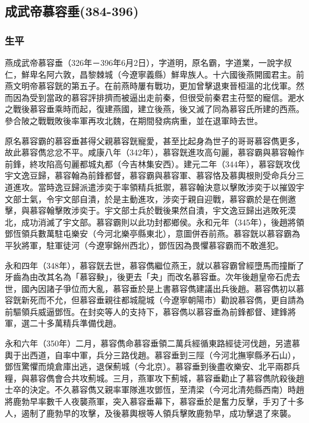 
\subsection{成武帝慕容垂\tiny(384-396)}

\subsubsection{生平}

燕成武帝慕容垂（326年－396年6月2日），字道明，原名霸，字道業，一說字叔仁，鮮卑名阿六敦，昌黎棘城（今遼寧義縣）鮮卑族人。十六國後燕開國君主。前燕文明帝慕容皝的第五子。在前燕時屢有戰功，更加曾擊退東晉桓溫的北伐軍。然而因為受到當政的慕容評排擠而被逼出走前秦，但很受前秦君主苻堅的寵信。淝水之戰後慕容垂乘時而起，復建燕國，建立後燕，後又滅了同為慕容氏所建的西燕。參合陂之戰戰敗後率軍再攻北魏，在期間發病病重，並在退軍時去世。

原名慕容霸的慕容垂甚得父親慕容皝寵愛，甚至比起身為世子的哥哥慕容儁更多，故此慕容儁忿忿不平。咸康八年（342年），慕容皝進攻高句麗，慕容霸與慕容翰作前鋒，終攻陷高句麗都城丸都（今吉林集安西）。建元二年（344年），慕容皝攻伐宇文逸豆歸，慕容翰為前鋒都督，慕容霸與慕容軍、慕容恪及慕輿根則受命兵分三道進攻。當時逸豆歸派遣涉奕于率領精兵抵禦，慕容翰決意以擊敗涉奕于以摧毀宇文部士氣，令宇文部自潰，於是主動進攻，涉奕于親自迎戰，慕容霸於是在側邀擊，與慕容翰擊敗涉奕于。宇文部士兵於戰後果然自潰，宇文逸豆歸出逃敗死漠北，成功消滅了宇文部。慕容霸則以此功封都鄉侯。永和元年（345年），後趙將領鄧恆領兵數萬駐屯樂安（今河北樂亭縣東北），意圖併吞前燕。慕容皝以慕容霸為平狄將軍，駐軍徒河（今遼寧錦州西北），鄧恆因為畏懼慕容霸而不敢進犯。

永和四年（348年），慕容皝去世，慕容儁繼位燕王，就以慕容霸曾經墮馬而撞斷了牙齒為由改其名為「慕容𡙇」，後更去「夬」而改名慕容垂。次年後趙皇帝石虎去世，國內因諸子爭位而大亂，慕容垂於是上書慕容儁建議出兵後趙。慕容儁初以慕容皝新死而不允，但慕容垂親往都城龍城（今遼寧朝陽市）勸說慕容儁，更自請為前驅領兵威逼鄧恆。在封奕等人的支持下，慕容儁以慕容垂為前鋒都督、建鋒將軍，選二十多萬精兵準備伐趙。

永和六年（350年）二月，慕容儁命慕容垂領二萬兵經循東路經徒河伐趙，另遣慕輿于出西道，自率中軍，兵分三路伐趙。慕容垂到三陘（今河北撫寧縣矛石山），鄧恆驚懼而燒倉庫出逃，退保薊城（今北京）。慕容垂到後盡收樂安、北平兩郡兵糧，與慕容儁會合共攻薊城。三月，燕軍攻下薊城，慕容垂勸止了慕容儁阬殺後趙士卒的決定。不久慕容儁又親率軍隊進攻鄧恆，至清梁（今河北清苑縣西南）時趙將鹿勃早率數千人夜襲燕軍，突入慕容垂幕下，慕容垂於是奮力反擊，手刃了十多人，遏制了鹿勃早的攻擊，及後慕輿根等人領兵擊敗鹿勃早，成功擊退了來襲。

